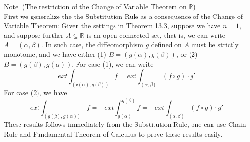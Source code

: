 \documentclass[11pt,oneside]{book}
\theoremstyle{break}
\theoremstyle{break}
\newcommand{\R}{\mathbb{R}}
\newcommand{\note}{\color{red}Note: \color{black}}
\begin{document}
\note (The restriction of the Change of Variable Theorem on $\R$)\\
First we generalize the the Substitution Rule as a consequence of the Change of Variable Theorem:
Given the settings in Theorem 13.3, suppose we have $n=1$, and suppose further $A\subseteq \R$ is an open connected set, that is, we can write $A= (\alpha,\beta)$. In such case, the diffeomorphism $g$ defined on $A$ must be strictly monotonic, and we have either (1) $B = (g(\alpha),g(\beta))$,  or (2) $B = (g(\beta),g(\alpha))$. For case (1), we can write: $$ext \int_{(g(\alpha),g(\beta))} f = ext \int_{(\alpha,\beta)} (f\circ g)\cdot g'$$ 
For case (2), we have $$ext \int_{(g(\beta),g(\alpha))} f = -ext\int_{g(\alpha)}^{g(\beta)} f=- ext \int_{(\alpha,\beta)} (f\circ g)\cdot g' $$
These results follows immediately from the Substitution Rule, one can use Chain Rule and Fundamental Theorem of Calculus to prove these results easily.\\
\end{document}
